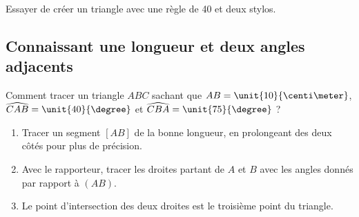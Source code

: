 \begin{example}
    Essayer de créer un triangle avec une règle de \unit{40}{\centi\meter} et deux stylos.
\end{example}

\subsection{Connaissant une longueur et deux angles adjacents}



\vspace{2cm}

Comment tracer un triangle \( ABC\) sachant que \( AB=\unit{10}{\centi\meter}\), \( \widehat{CAB}=\unit{40}{\degree}\) et \( \widehat{CBA}=\unit{75}{\degree}\) ?



\begin{enumerate}
    \item
        Tracer un segment $[AB]$ de la bonne longueur, en prolongeant des deux côtés pour plus de précision.

\begin{center}
   
\end{center}
\item
    Avec le rapporteur, tracer les droites partant de \( A\) et \( B\) avec les angles donnés par rapport à \( (AB)\).

\begin{center}
   
\end{center}

\item

    Le point d'intersection des deux droites est le troisième point du triangle.

\begin{center}
   
\end{center}

\end{enumerate}



